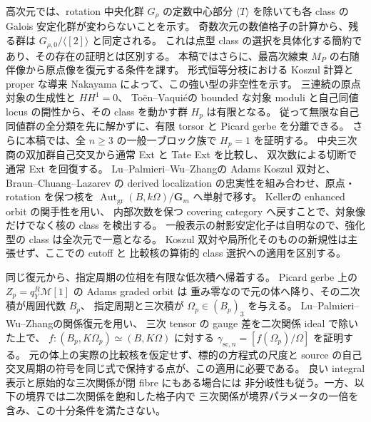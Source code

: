 \documentclass[11pt,a4paper]{ltjsarticle}
\numberwithin{equation}{section}
\begin{document}
高次元では、rotation 中央化群 $G_\rho$ の定数中心部分
$\langle T\rangle$ を除いても各 class の Galois 安定化群が変わらないことを示す。
奇数次元の数値格子の計算から、残る群は
$G_{\rho,0}/\langle[2]\rangle$ と同定される。
これは点型 class の選択を具体化する簡約であり、その存在の証明とは区別する。
本稿ではさらに、最高次線束 $M_P$ の右随伴像から原点像を復元する条件を課す。
形式恒等分枝における Koszul 計算と proper な導来 Nakayama によって、この強い型の非空性を示す。
三連続の原点対象の生成性と $HH^1=0$、
To\"en--Vaqui\'e\cite[Proposition~3.20, Corollary~3.24]{NFMToenVaquieModuli}の
bounded な対象 moduli と自己同値 locus の開性から、その class を動かす群 $H_p$ は有限となる。
従って無限な自己同値群の全分類を先に解かずに、有限 torsor と Picard gerbe を分離できる。
さらに本稿では、全 $n\ge3$ の一般一ブロック族で $H_p=1$ を証明する。
中央三次商の双加群自己交叉から通常 Ext と Tate Ext を比較し、
双次数による切断で通常 Ext を回復する。
Lu--Palmieri--Wu--Zhang\cite[Theorem~2.4, Corollary~2.5]{NFMLPWZKoszul}の
Adams Koszul 双対と、Braun--Chuang--Lazarev
\cite[Proposition~3.17, Theorems~3.18, 5.3]{NFMBCLLocalization}の
derived localization の忠実性を組み合わせ、原点・rotation を保つ核を
$\operatorname{Aut}_{\mathrm{gr}}(B,k\Omega)/\mathbf G_m$ へ単射で移す。
Keller\cite[Sections~9.3--9.4]{NFMKellerOrbit}の enhanced orbit の関手性を用い、
内部次数を保つ covering category へ戻すことで、対象像だけでなく核の class を検出する。
一般表示の射影安定化子は自明なので、強化型の class は全次元で一意となる。
Koszul 双対や局所化そのものの新規性は主張せず、ここでの cutoff と
比較核の算術的 class 選択への適用を区別する。

同じ復元から、指定周期の位相を有限な低次積へ帰着する。
Picard gerbe 上の $Z_p=q_Y^R\mathcal M[1]$ の Adams graded orbit は
重み零なので元の体へ降り、その二次積が周囲代数 $B_p$、
指定周期と三次積が $\Omega_p\in(B_p)_3$ を与える。
Lu--Palmieri--Wu--Zhang\cite[Corollary~B]{NFMLPWZExt}の関係復元を用い、
三次 tensor の gauge 差を二次関係 ideal で除いた上で、
$f:(B_p,K\Omega_p)\simeq(B,K\Omega)$ に対する
$\gamma_{\mathrm{sc},n}=[f(\Omega_p)/\Omega]$ を証明する。
元の体上の実際の比較核を仮定せず、標的の方程式の尺度と
source の自己交叉周期の符号を同じ式で保持する点が、この適用に必要である。
良い integral 表示と原始的な三次関係が閉 fibre にもある場合には
非分岐性も従う。一方、以下の境界では二次関係を飽和した格子内で
三次関係が境界パラメータの一倍を含み、この十分条件を満たさない。
\end{document}
